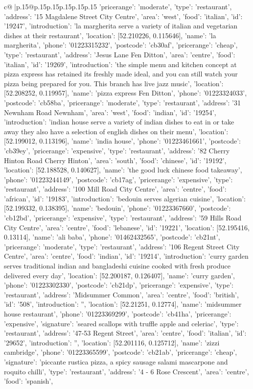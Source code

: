 \documentclass{article}
\begin{document}
{\begin{supertabular}{c@{$\;$}|p{.15\linewidth}@{}p{.15\linewidth}p{.15\linewidth}p{.15\linewidth}p{.15\linewidth}p{.15\linewidth}}
{{{'pricerange': 'moderate', 'type': 'restaurant'}, {'address': '15 Magdalene Street City Centre', 'area': 'west', 'food': 'italian', 'id': '19247', 'introduction': 'la margherita serve a variety of italian and vegetarian dishes at their restaurant', 'location': [52.210226, 0.115646], 'name': 'la margherita', 'phone': '01223315232', 'postcode': 'cb30af', 'pricerange': 'cheap', 'type': 'restaurant'}, {'address': 'Jesus Lane Fen Ditton', 'area': 'centre', 'food': 'italian', 'id': '19269', 'introduction': 'the simple menu and kitchen concept at pizza express has retained its freshly made ideal, and you can still watch your pizza being prepared for you. This branch has live jazz music', 'location': [52.208252, 0.119957], 'name': 'pizza express Fen Ditton', 'phone': '01223324033', 'postcode': 'cb58ba', 'pricerange': 'moderate', 'type': 'restaurant'}, {'address': '31 Newnham Road Newnham', 'area': 'west', 'food': 'indian', 'id': '19254', 'introduction': 'indian house serve a variety of indian dishes to eat in or take away they also have a selection of english dishes on their menu', 'location': [52.199012, 0.113196], 'name': 'india house', 'phone': '01223461661', 'postcode': 'cb39ey', 'pricerange': 'expensive', 'type': 'restaurant'}, {'address': '82 Cherry Hinton Road Cherry Hinton', 'area': 'south', 'food': 'chinese', 'id': '19192', 'location': [52.188528, 0.140627], 'name': 'the good luck chinese food takeaway', 'phone': '01223244149', 'postcode': 'cb17ag', 'pricerange': 'expensive', 'type': 'restaurant'}, {'address': '100 Mill Road City Centre', 'area': 'centre', 'food': 'african', 'id': '19183', 'introduction': 'bedouin serves algerian cuisine', 'location': [52.199332, 0.138395], 'name': 'bedouin', 'phone': '01223367660', 'postcode': 'cb12bd', 'pricerange': 'expensive', 'type': 'restaurant'}, {'address': '59 Hills Road City Centre', 'area': 'centre', 'food': 'lebanese', 'id': '19221', 'location': [52.195416, 0.13114], 'name': 'ali baba', 'phone': '01462432565', 'postcode': 'cb21nt', 'pricerange': 'moderate', 'type': 'restaurant'}, {'address': '106 Regent Street City Centre', 'area': 'centre', 'food': 'indian', 'id': '19214', 'introduction': 'curry garden serves traditional indian and bangladeshi cuisine cooked with fresh produce delivered every day', 'location': [52.200187, 0.126407], 'name': 'curry garden', 'phone': '01223302330', 'postcode': 'cb21dp', 'pricerange': 'expensive', 'type': 'restaurant'}, {'address': 'Midsummer Common', 'area': 'centre', 'food': 'british', 'id': '508', 'introduction': '', 'location': [52.21251, 0.12774], 'name': 'midsummer house restaurant', 'phone': '01223369299', 'postcode': 'cb41ha', 'pricerange': 'expensive', 'signature': 'seared scallops with truffle apple and celeriac', 'type': 'restaurant'}, {'address': '47-53 Regent Street', 'area': 'centre', 'food': 'italian', 'id': '29652', 'introduction': '', 'location': [52.201116, 0.125712], 'name': 'zizzi cambridge', 'phone': '01223365599', 'postcode': 'cb21ab', 'pricerange': 'cheap', 'signature': 'piccante rustica pizza, a spicy sausage salami mascarpone and roquito chilli', 'type': 'restaurant'}, {'address': '4 - 6 Rose Crescent', 'area': 'centre', 'food': 'spanish', }}}
\end{supertabular}}
\end{document}
